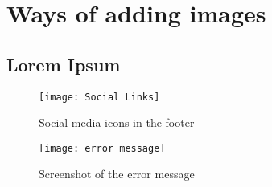 \newpage
\section{Ways of adding images}
\subsection{Lorem Ipsum}
\begin{wrapfigure}{r}{0.35\textwidth}
    \centering
    \texttt{[image: Social Links]}
    \caption{Social media icons in the footer}
    \label{fig:socialLinks}
\end{wrapfigure}
\lipsum[2]

\begin{figure}[h]
    \centering
    \texttt{[image: error message]}
    \caption{Screenshot of the error message}
    \label{fig:errormessage}
\end{figure}
\lipsum[2]